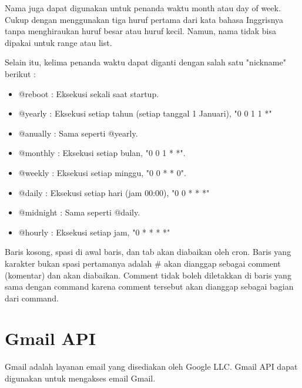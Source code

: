 Nama juga dapat digunakan untuk penanda waktu month atau day of week. Cukup dengan menggunakan tiga huruf pertama dari kata bahasa Inggrisnya tanpa menghiraukan huruf besar atau huruf kecil. Namun, nama tidak bisa dipakai untuk range atau list.  

Selain itu, kelima penanda waktu dapat diganti dengan salah satu "nickname" berikut :
\begin{itemize}
\item @reboot : Eksekusi sekali saat startup.
\item @yearly : Eksekusi setiap tahun (setiap tanggal 1 Januari), "0 0 1 1 *"
\item @anually : Sama seperti @yearly.
\item @monthly : Eksekusi setiap bulan, "0 0 1 * *".
\item @weekly : Eksekusi setiap minggu, "0 0 * * 0".
\item @daily : Eksekusi setiap hari (jam 00:00), "0 0 * * *"
\item @midnight : Sama seperti @daily.
\item @hourly : Eksekusi setiap jam, "0 * * * *"
\end{itemize}

Baris kosong, spasi di awal baris, dan tab akan diabaikan oleh cron. Baris yang karakter bukan spasi pertamanya  adalah \# akan dianggap sebagai comment (komentar) dan akan diabaikan. Comment tidak boleh diletakkan di baris yang sama dengan command karena comment tersebut akan dianggap sebagai bagian dari command.

\section{Gmail API ~\cite{gmail-api}}
\label{sec:gmail-api}
Gmail adalah layanan email yang disediakan oleh Google LLC. Gmail API dapat digunakan untuk mengakses email Gmail.

